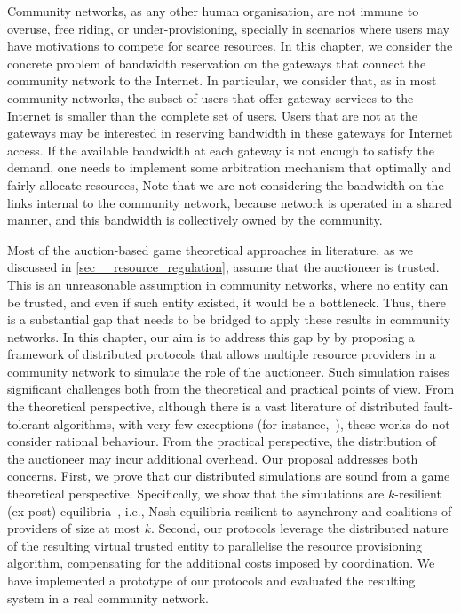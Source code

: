 Community networks, as any other human organisation, are not immune to overuse, free riding, or under-provisioning, 
specially in scenarios where users may have motivations to compete for scarce resources. 
In this chapter, we consider the concrete problem of bandwidth reservation on the gateways that connect the community network to the Internet. 
In particular, we consider that, as in most community networks, the subset of users that offer gateway services to the Internet is smaller than the complete set of users. 
Users that are not at the gateways may be interested in reserving bandwidth in these gateways for Internet access.
If the available bandwidth at each gateway is not enough to satisfy the demand, 
one needs to implement some arbitration mechanism that optimally and fairly allocate resources, 
Note that we are not considering the bandwidth on the links internal to the community network,
because network is operated in a shared manner, 
and this bandwidth is collectively owned by the community.


Most of the auction-based game theoretical approaches in literature, 
as we discussed in \cref{sec__resource_regulation}, 
assume that the auctioneer is trusted.
This is an unreasonable assumption in community networks, where no entity can be trusted,
and even if such entity existed, it would be a bottleneck. 
Thus, there is a substantial gap that needs to be bridged to apply these results in community networks.
In this chapter, our aim is to address this gap by by proposing a framework of 
distributed protocols that allows multiple resource providers 
in a community network to simulate the role of the auctioneer.
Such simulation raises significant challenges both from the 
theoretical and practical points of view. 
From the theoretical perspective, 
although there is a vast literature of distributed fault-tolerant algorithms, 
with very few exceptions (for instance,~\cite{Abraham2013}), 
these works do not consider rational behaviour. From the practical 
perspective, the distribution of the auctioneer may incur 
additional overhead. Our proposal addresses both concerns. First, 
we prove that our distributed simulations are sound from a game 
theoretical perspective. Specifically, we show that the 
simulations are $k$-resilient (ex post) equilibria~\cite{Abraham2013}, i.e., 
Nash equilibria resilient to asynchrony and coalitions of providers 
of size at most $k$. 
Second, our protocols leverage the distributed nature of the 
resulting virtual trusted entity to parallelise the resource 
provisioning algorithm, compensating for the additional costs
imposed by coordination. 
We have implemented a prototype of our
protocols and evaluated the resulting system in a real community network. 

